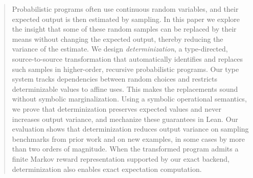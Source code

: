 \begin{abstract}
Probabilistic programs often use continuous random variables, and their expected output is then estimated by sampling. In this paper we explore the insight that some of these random samples can be replaced by their means without changing the expected output, thereby reducing the variance of the estimate. We design \emph{determinization}, a type-directed, source-to-source transformation that automatically identifies and replaces such samples in higher-order, recursive probabilistic programs. Our type system tracks dependencies between random choices and restricts determinizable values to affine uses. This makes the replacements sound without symbolic marginalization. Using a symbolic operational semantics, we prove that determinization preserves expected values and never increases output variance, and mechanize these guarantees in Lean. Our evaluation shows that determinization reduces output variance on sampling benchmarks from prior work and on new examples, in some cases by more than two orders of magnitude. When the transformed program admits a finite Markov reward
representation supported by our exact backend, determinization also
enables exact expectation computation.
\end{abstract}
